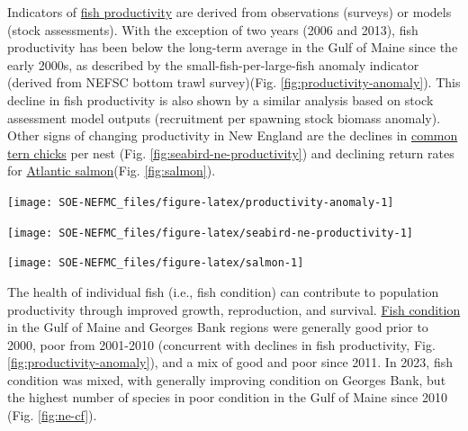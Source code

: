 \documentclass[
  10pt,
]{article}
\let\origfigure\figure
\let\endorigfigure\endfigure
\renewenvironment{figure}[1][2] {
    \expandafter\origfigure\expandafter[H]
} {
    \endorigfigure
}
\begin{document}
Indicators of \href{https://noaa-edab.github.io/catalog/productivity_anomaly.html}{fish productivity} are derived from observations (surveys) or models (stock assessments). With the exception of two years (2006 and 2013), fish productivity has been below the long-term average in the Gulf of Maine since the early 2000s, as described by the small-fish-per-large-fish anomaly indicator (derived from NEFSC bottom trawl survey)(Fig. \ref{fig:productivity-anomaly}). This decline in fish productivity is also shown by a similar analysis based on stock assessment model outputs (recruitment per spawning stock biomass anomaly). Other signs of changing productivity in New England are the declines in \href{https://noaa-edab.github.io/catalog/seabird_ne.html}{common tern chicks} per nest (Fig. \ref{fig:seabird-ne-productivity}) and declining return rates for \href{https://noaa-edab.github.io/catalog/gom_salmon.html}{Atlantic salmon}(Fig. \ref{fig:salmon}).

\begin{figure}

{\centering \texttt{[image: SOE-NEFMC\_files/figure-latex/productivity-anomaly-1]} 

}

\caption{Fish productivity measures. Top: Small-fish-per-large-fish survey biomass anomaly in the Gulf of Maine. Bottom: assessment recruitment per spawning stock biomass anomaly for stocks managed by the New England Fishery Management Council region. The summed anomaly across species is shown by the black line, drawn across all years with the same number of stocks analyzed.}\label{fig:productivity-anomaly}
\end{figure}
\begin{figure}

{\centering \texttt{[image: SOE-NEFMC\_files/figure-latex/seabird-ne-productivity-1]} 

}

\caption{Productivity of Common terns in the Gulf of Maine.}\label{fig:seabird-ne-productivity}
\end{figure}
\begin{figure}

{\centering \texttt{[image: SOE-NEFMC\_files/figure-latex/salmon-1]} 

}

\caption{Return rate proportions and abundance of Atlantic salmon.}\label{fig:salmon}
\end{figure}

The health of individual fish (i.e., fish condition) can contribute to population productivity through improved growth, reproduction, and survival. \href{https://noaa-edab.github.io/catalog/condition.html}{Fish condition} in the Gulf of Maine and Georges Bank regions were generally good prior to 2000, poor from 2001-2010 (concurrent with declines in fish productivity, Fig. \ref{fig:productivity-anomaly}), and a mix of good and poor since 2011. In 2023, fish condition was mixed, with generally improving condition on Georges Bank, but the highest number of species in poor condition in the Gulf of Maine since 2010 (Fig. \ref{fig:ne-cf}).
\end{document}

